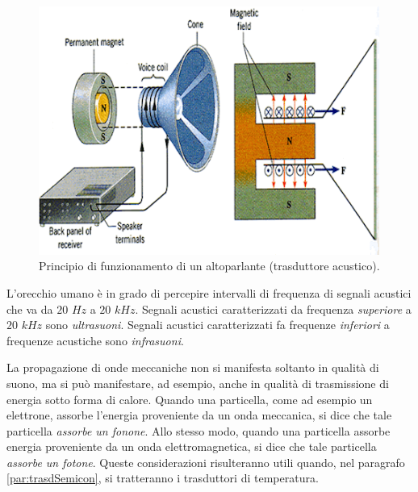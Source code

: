 \documentclass[17pt]{extarticle}
\begin{document}
\begin{figure}[t]
	\centering
   	\includegraphics[width=4.4in]{speakerMagneticField.png}%
  	\caption{Principio di funzionamento di un altoparlante (trasduttore acustico).}
   	\label{fig:trasduttoreSuono}
\end{figure}




L'orecchio umano è in grado di percepire intervalli di frequenza di segnali acustici che va da $20$ $Hz$ a $20$ $kHz$. Segnali acustici caratterizzati da frequenza \emph{superiore} a $20$ $kHz$ sono \emph{ultrasuoni}. Segnali acustici caratterizzati fa frequenze \emph{inferiori} a frequenze acustiche sono \emph{infrasuoni}. 


La propagazione di onde meccaniche non si manifesta soltanto in qualità di suono, ma si può manifestare, ad esempio, anche in qualità di trasmissione di energia sotto forma di calore.
Quando una particella, come ad esempio un elettrone, assorbe l'energia proveniente da un onda meccanica, si dice che tale particella \emph{assorbe un fonone}. Allo stesso modo, quando una particella assorbe energia proveniente da un onda elettromagnetica, si dice che tale particella \emph{assorbe un fotone}. 
Queste considerazioni risulteranno utili quando, nel paragrafo \ref{par:trasdSemicon}, si tratteranno i trasduttori di temperatura.
\end{document}

